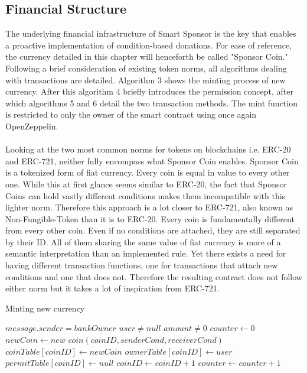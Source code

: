 \subsection{Financial Structure}
The underlying financial infrastructure of Smart Sponsor is the key that enables a proactive implementation of condition-based donations. For ease of reference, the currency detailed in this chapter will henceforth be called "Sponsor Coin." Following a brief consideration of existing token norms, all algorithms dealing with transactions are detailed. Algorithm 3 shows the minting process of new currency. After this algorithm 4 briefly introduces the permission concept, after which algorithms 5 and 6 detail the two transaction methods. The mint function is restricted to only the owner of the smart contract using once again OpenZeppelin\cite{Zeppelin}.\\
\\
Looking at the two most common norms for tokens on blockchains i.e. ERC-20 and ERC-721, neither fully encompass what Sponsor Coin enables. Sponsor Coin is a tokenized form of fiat currency. Every coin is equal in value to every other one. While this at first glance seems similar to ERC-20, the fact that Sponsor Coins can hold vastly different conditions makes them incompatible with this lighter norm. Therefore this approach is a lot closer to ERC-721, also known as Non-Fungible-Token than it is to ERC-20. Every coin is fundamentally different from every other coin. Even if no conditions are attached, they are still separated by their ID. All of them sharing the same value of fiat currency is more of a semantic interpretation than an implemented rule. Yet there exists a need for having different transaction functions, one for transactions that attach new conditions and one that does not. Therefore the resulting contract does not follow either norm but it takes a lot of inspiration from ERC-721.\\
\begin{algorithm}
\caption{Minting new currency}\label{alg:mint}
\begin{algorithmic}
\Require $message.sender = bankOwner$
\Require $user \neq null$
\Require $amount \neq 0$
\State $counter \gets 0$
\State $newCoin \gets new$ $coin(coinID, senderCond, receiverCond)$
\State $coinTable[coinID] \gets newCoin$
\State $ownerTable[coinID] \gets user$
\State $permitTable[coinID] \gets null$
\State $coinID \gets coinID + 1$
\State $counter \gets counter + 1$
\EndWhile
\end{algorithmic}
\end{algorithm}
